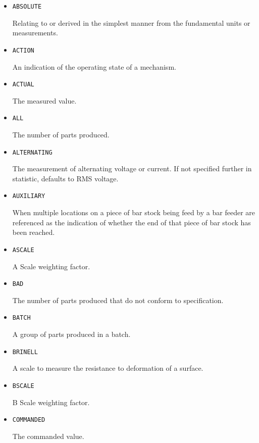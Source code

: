 \begin{itemize}


\item \texttt{ABSOLUTE}  

Relating to or derived in the simplest manner from the fundamental units or measurements.


\item \texttt{ACTION}  

An indication of the operating state of a mechanism.


\item \texttt{ACTUAL}  

The measured value.


\item \texttt{ALL}  

The number of parts produced.


\item \texttt{ALTERNATING}  

The measurement of alternating voltage or current.   If not specified further in statistic, defaults to RMS voltage. 


\item \texttt{AUXILIARY}  

When multiple locations on a piece of bar stock being feed by a bar feeder are referenced as the indication of whether the end of that piece of bar stock has been reached.


\item \texttt{A\textunderscore SCALE}  

A Scale weighting factor.


\item \texttt{BAD}  

The number of parts produced that do not conform to specification.


\item \texttt{BATCH}  

A group of parts produced in a batch.


\item \texttt{BRINELL}  

A scale to measure the resistance to deformation of a surface.


\item \texttt{B\textunderscore SCALE}  

B Scale weighting factor.


\item \texttt{COMMANDED}  

The commanded value.



\end{itemize}
